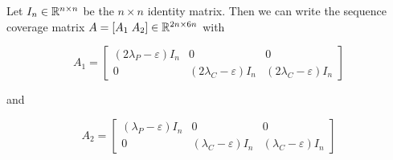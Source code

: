 Let $I_n \in \mathbb{R}^{n \times n}$ be the $n \times n$ identity matrix. Then we can write the sequence coverage matrix $A = [A_1 \; A_2] \in \mathbb{R}^{2n \times 6n}$ with
\renewcommand{\arraystretch}{2}
\begin{center}
	$$ A_1 = 
	\left[
	\begin{array}{c|c|c}
		(2 \lambda_P - \varepsilon)I_n  & 0 & 0 \\ \hline
		0  & (2 \lambda_C - \varepsilon)I_n &  (2 \lambda_C - \varepsilon)I_n 
	\end{array}
	\right]
	$$
\end{center}
and 
\begin{center}
	$$ A_2 = 
	\left[
	\begin{array}{c|c|c}
		(\lambda_P - \varepsilon)I_n  & 0 & 0 \\ \hline
		0  & (\lambda_C - \varepsilon)I_n &  (\lambda_C- \varepsilon)I_n 
	\end{array}
	\right]
	$$
\end{center}